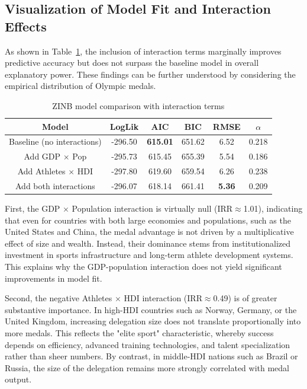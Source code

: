\documentclass[11pt,twoside]{article}
\numberwithin{Theorem}{section}
\numberwithin{Definition}{section}
\numberwithin{Lemma}{section}
\numberwithin{Algorithm}{section}
\numberwithin{equation}{section}
\begin{document}
\subsection{Visualization of Model Fit and Interaction Effects}

As shown in Table~\ref{tab:zinb_interactions}, the inclusion of interaction terms marginally improves predictive accuracy but does not surpass the baseline model in overall explanatory power. These findings can be further understood by considering the empirical distribution of Olympic medals.  

\begin{table}[H]
\centering
\caption{ZINB model comparison with interaction terms}
\label{tab:zinb_interactions}
\begin{tabular}{cccccc}
\hline
Model & LogLik & AIC & BIC & RMSE & $\alpha$ \\
\hline
Baseline (no interactions) & -296.50 & \textbf{615.01} & 651.62 & 6.52 & 0.218 \\
Add GDP $\times$ Pop & -295.73 & 615.45 & 655.39 & 5.54 & 0.186 \\
Add Athletes $\times$ HDI & -297.80 & 619.60 & 659.54 & 6.26 & 0.238 \\
Add both interactions & -296.07 & 618.14 & 661.41 & \textbf{5.36} & 0.209 \\
\hline
\end{tabular}
\end{table}

First, the GDP $\times$ Population interaction is virtually null (IRR$\approx$1.01), indicating that even for countries with both large economies and populations, such as the United States and China, the medal advantage is not driven by a multiplicative effect of size and wealth. Instead, their dominance stems from institutionalized investment in sports infrastructure and long-term athlete development systems. This explains why the GDP-population interaction does not yield significant improvements in model fit.  

Second, the negative Athletes $\times$ HDI interaction (IRR$\approx$0.49) is of greater substantive importance. In high-HDI countries such as Norway, Germany, or the United Kingdom, increasing delegation size does not translate proportionally into more medals. This reflects the "elite sport" characteristic, whereby success depends on efficiency, advanced training technologies, and talent specialization rather than sheer numbers. By contrast, in middle-HDI nations such as Brazil or Russia, the size of the delegation remains more strongly correlated with medal output.  
\end{document}
